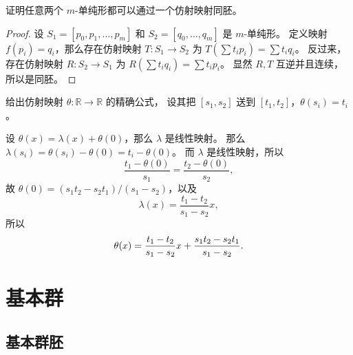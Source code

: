 \documentclass[fontset=none]{Notes}
\begin{document}
\begin{problem}{}{}
  证明任意两个 $m$-单纯形都可以通过一个仿射映射同胚。
\end{problem}
\begin{proof}
  设 $S_1=[p_0,p_1,\dots,p_m]$ 和 $S_2=[q_0,\dots,q_m]$ 是 $m$-单纯形。
  定义映射 $f(p_i)=q_i$，那么存在仿射映射
  $T:S_1\to S_2$ 为 $T(\sum t_ip_i)=\sum t_iq_i$。
  反过来，存在仿射映射 $R:S_2\to S_1$ 为 $R(\sum t_iq_i)=\sum t_ip_i$。
  显然 $R,T$ 互逆并且连续，所以是同胚。
\end{proof}

\begin{problem}{}{}
  给出仿射映射 $\theta:\mathbb{R}\to \mathbb{R}$ 的精确公式，
  设其把 $[s_1,s_2]$ 送到 $[t_1,t_2]$，$\theta(s_i)=t_i$。
\end{problem}
\begin{solution}
  设 $\theta(x)=\lambda(x)+\theta(0)$，那么 $\lambda$ 是线性映射。
  那么 $\lambda(s_i)=\theta(s_i)-\theta(0)=t_i-\theta(0)$。
  而 $\lambda$ 是线性映射，所以
  \[
    \frac{t_1-\theta(0)}{s_1}=\frac{t_2-\theta(0)}{s_2},
  \]
  故 $\theta(0)=(s_1t_2-s_2t_1)/(s_1-s_2)$，以及
  \[
    \lambda(x)=\frac{t_1-t_2}{s_1-s_2}x,
  \]
  所以
  \[
    \theta(x)=\frac{t_1-t_2}{s_1-s_2}x+\frac{s_1t_2-s_2t_1}{s_1-s_2}.\qedhere
  \]
\end{solution}

\chapter{基本群}

\section{基本群胚}
\end{document}
